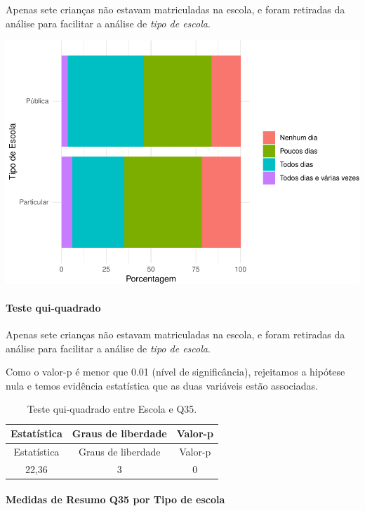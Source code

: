 \documentclass[]{article}
\let\oldparagraph\paragraph
\renewcommand{\paragraph}[1]{\oldparagraph{#1}\mbox{}}
\begin{document}
Apenas sete crianças não estavam matriculadas na escola, e foram retiradas da análise para facilitar a análise de \emph{tipo de escola}.

\begin{center}\includegraphics[width=0.75\linewidth]{relatorio_covid19_files/figure-latex/unnamed-chunk-1292-1} \end{center}

\hypertarget{teste-qui-quadrado-111}{%
\paragraph{Teste qui-quadrado}\label{teste-qui-quadrado-111}}

Apenas sete crianças não estavam matriculadas na escola, e foram retiradas da análise para facilitar a análise de \emph{tipo de escola}.

Como o valor-p é menor que 0.01 (nível de significância), rejeitamos a hipótese nula e temos evidência estatística que as duas variáveis estão associadas.

\begin{longtable}[]{@{}ccc@{}}
\caption{\label{tab:unnamed-chunk-1294}Teste qui-quadrado entre Escola e Q35.}\tabularnewline
\toprule
Estatística & Graus de liberdade & Valor-p\tabularnewline
\midrule
\endfirsthead
\toprule
Estatística & Graus de liberdade & Valor-p\tabularnewline
\midrule
\endhead
22,36 & 3 & 0\tabularnewline
\bottomrule
\end{longtable}

\cleardoublepage

\hypertarget{medidas-de-resumo-q35-por-tipo-de-escola}{%
\paragraph{Medidas de Resumo Q35 por Tipo de escola}\label{medidas-de-resumo-q35-por-tipo-de-escola}}
\end{document}
